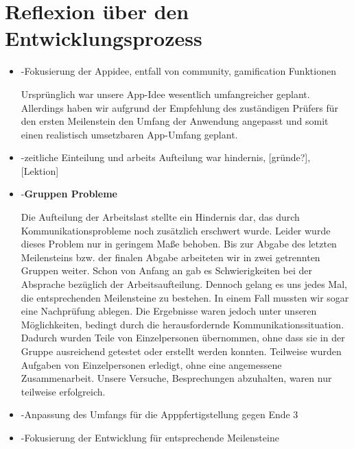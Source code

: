 \documentclass{article}
\begin{document}
\section{Reflexion über den Entwicklungsprozess}
 \begin{itemize}
    \item -Fokusierung der Appidee, entfall von community, gamification Funktionen
    
    Ursprünglich war unsere App-Idee wesentlich umfangreicher geplant. Allerdings haben wir aufgrund der Empfehlung des zuständigen Prüfers für den ersten Meilenstein den Umfang der Anwendung angepasst und somit einen realistisch umsetzbaren App-Umfang geplant.
	\item -zeitliche Einteilung und arbeits Aufteilung war hindernis,         [gründe?], [Lektion]
	\item -\textbf{Gruppen Probleme}
	
		Die Aufteilung der Arbeitslast stellte ein Hindernis dar, das durch Kommunikationsprobleme noch zusätzlich erschwert wurde. Leider wurde dieses Problem nur in geringem Maße behoben. Bis zur Abgabe des letzten Meilensteins bzw. der finalen Abgabe arbeiteten wir in zwei getrennten Gruppen weiter. Schon von Anfang an gab es Schwierigkeiten bei der Absprache bezüglich der Arbeitsaufteilung. Dennoch gelang es uns jedes Mal, die entsprechenden Meilensteine zu bestehen. In einem Fall mussten wir sogar eine Nachprüfung ablegen. Die Ergebnisse waren jedoch unter unseren Möglichkeiten, bedingt durch die herausfordernde Kommunikationssituation. Dadurch wurden Teile von Einzelpersonen übernommen, ohne dass sie in der Gruppe ausreichend getestet oder erstellt werden konnten. Teilweise wurden Aufgaben von Einzelpersonen erledigt, ohne eine angemessene Zusammenarbeit. Unsere Versuche, Besprechungen abzuhalten, waren nur teilweise erfolgreich.
	\item -Anpassung des Umfangs für die Apppfertigstellung gegen Ende 3
 	\item -Fokusierung der Entwicklung für entsprechende Meilensteine
 	

\end{itemize}
\end{document}
